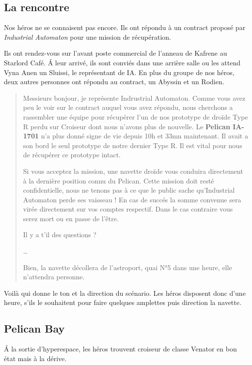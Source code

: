 \documentclass{jdrp}
\begin{document}
\subsection{La rencontre}
Nos héros ne se connaisent pas encore. Ils ont répondu à un contract proposé par \emph{Industrial Automaton} pour une mission de récupération.

Ils ont rendez-vous sur l'avant poste commercial de l'anneau de Kafrene au Starlord Café. \'A leur arrivé, ils sont conviés dans une arrière salle ou les attend Vyna Anen un Sluissi, le représentant de IA. En plus du groupe de nos héros, deux autres personnes ont répondu au contract, un Abyssin et un Rodien.

\begin{quote}
	Messieurs bonjour, je représente Indrustrial Automaton.
	Comme vous avez peu le voir sur le contract auquel vous avez répondu, nous cherchons a rassembler une équipe pour récupérer l'un de nos prototype de droïde Type R perdu sur Croiseur dont nous n'avons plus de nouvelle.
	Le \textbf{Pelican IA-1701} n'a plus donné signe de vie depuis 10h et 33mn maintenant. Il avait a son bord le seul prototype de notre dernier Type R. Il est vital pour nous de récupérer ce prototype intact.

	Si vous acceptez la mission, une navette droïde vous conduira directement à la dernière position connu du Pelican. Cette mission doit resté confidentielle, nous ne tenons pas à ce que le public sache qu'Industrial Automaton perde ses vaisseau !
	En cas de succés la somme convenue sera virée directement sur vos comptes respectif. Dans le cas contraire vous serez mort ou en passe de l'être.

	Il y a t'il des questions ?

	\ldots

	Bien, la navette décollera de l'astroport, quai N°5 dans une heure, elle n'attendra personne.
\end{quote}

Voilà qui donne le ton et la direction du scénario. Les héros disposent donc d'une heure, s'ils le souhaitent pour faire quelques amplettes puis direction la navette.

\subsection{Pelican Bay}
\begin{flushright} 
	\begin{minipage}[r]{0.7\linewidth}
		\hspace{-2\baselineskip}\'A la sortie d'hyperespace, les héros trouvent croiseur de classe Venator en bon état mais à la dérive.
	\end{minipage}
\end{flushright} 
\end{document}

